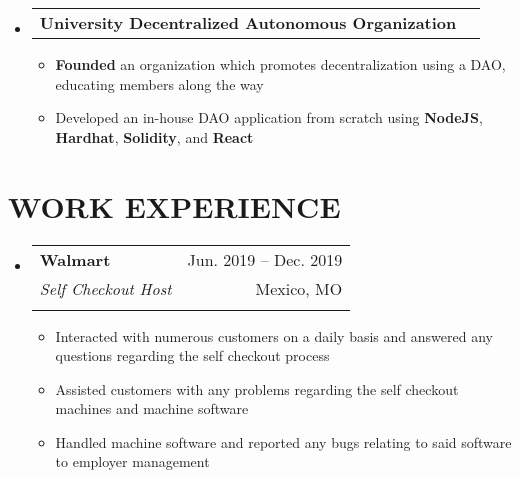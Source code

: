\documentclass[letterpaper,11pt]{article}
\makeatletter
\newcommand{\resumeItem}[1]{
  \item\small{
    {#1 \vspace{-1pt}}
  }
}
\newcommand{\resumeSubheading}[5]{
  \vspace{-1pt}\item
    \begin{tabular*}{\textwidth}[t]{l@{\extracolsep{\fill}}r}
      \textbf{#1} & {\color{dark-grey}\small #2}\vspace{1pt}\\ %
      \textit{#3} & {\color{dark-grey} \small #4}\vspace{1pt}\\ %
      & \color{dark-grey} \small #5
    \end{tabular*}\vspace{-20pt}
}
\newcommand{\resumeExtracurricularsHeading}[1]{
    \item
    \begin{tabular*}{\textwidth}{l@{\extracolsep{\fill}}r}
      #1 & {\color{dark-grey}} \\
    \end{tabular*}\vspace{-7pt}
}
\newcommand{\resumeSubHeadingListStart}{\begin{itemize}[leftmargin=0in, label={}]}
\newcommand{\resumeSubHeadingListEnd}{\end{itemize}}
\newcommand{\resumeItemListStart}{\begin{itemize}\setlength{\itemindent}{-1em}}
\newcommand{\resumeItemListEnd}{\end{itemize}\vspace{0pt}}
\makeatother
\begin{document}
\resumeSubHeadingListStart
\resumeExtracurricularsHeading
{\textbf{University Decentralized Autonomous Organization}}
\resumeItemListStart
\resumeItem{\textbf{Founded} an organization which promotes decentralization using a DAO, educating members along the way}
\resumeItem{Developed an in-house DAO application from scratch using \textbf{NodeJS}, \textbf{Hardhat}, \textbf{Solidity}, and \textbf{React}}
\resumeItemListEnd
\resumeSubHeadingListEnd

\section{WORK EXPERIENCE}
\resumeSubHeadingListStart
\resumeSubheading
{Walmart}{Jun. 2019 -- Dec. 2019}
{Self Checkout Host}{Mexico, MO}
{}
\resumeItemListStart
\resumeItem{Interacted with numerous customers on a daily basis and answered any questions regarding the self checkout process}
\resumeItem{Assisted customers with any problems regarding the self checkout machines and machine software}
\resumeItem{Handled machine software and reported any bugs relating to said software to employer management}
\resumeItemListEnd
\resumeSubHeadingListEnd
\end{document}
